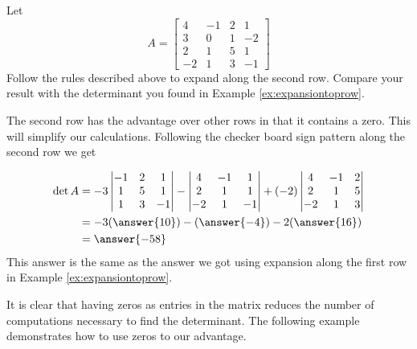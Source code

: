 \documentclass{ximera}
\begin{document}
 \begin{example}\label{ex:laplace1}
Let  
$$A=\begin{bmatrix}4&-1&2&1\\3&0&1&-2\\
2&1&5&1\\-2&1&3&-1\end{bmatrix}$$
Follow the rules described above to expand along the second row.  Compare your result with the determinant you found in Example \ref{ex:expansiontoprow}.
\begin{explanation}

 The second row has the advantage over other rows in that it contains a zero.  This will simplify our calculations.  Following the checker board sign pattern along the second row we get

\begin{align*}
\det{A}
&=-3\begin{vmatrix}-1&2&1\\1&5&1\\1&3&-1\end{vmatrix}-\begin{vmatrix}4&-1&1\\2&1&1\\-2&1&-1\end{vmatrix}+(-2)\begin{vmatrix}4&-1&2\\2&1&5\\-2&1&3\end{vmatrix}\\&=-3(\answer{10})-(\answer{-4})-2(\answer{16})\\
&=\answer{-58}
\end{align*}
This answer is the same as the answer we got using expansion along the first row in Example \ref{ex:expansiontoprow}.
    
\end{explanation}
 \end{example}
 
It is clear that having zeros as entries in the matrix reduces the number of computations necessary to find the determinant.  The following example demonstrates how to use zeros to our advantage.
\end{document}

